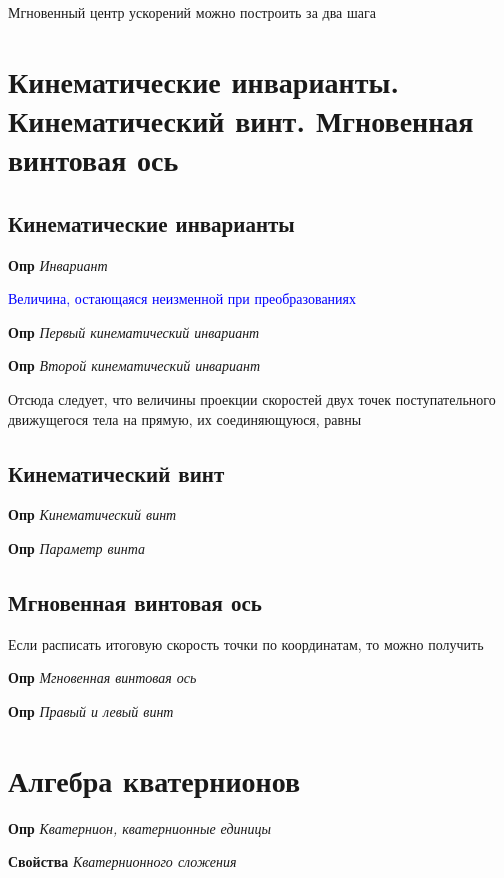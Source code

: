 \documentclass[a4paper, 14pt]{article}
\begin{document}
    Мгновенный центр ускорений можно построить за два шага
    
    \section{Кинематические инварианты.
    Кинематический винт.
    Мгновенная винтовая ось}
    
    \subsection{Кинематические инварианты}
    
    \textbf{Опр} \textit{Инвариант}
    
    \textcolor{blue}{Величина, остающаяся неизменной при преобразованиях}
    
    \textbf{Опр} \textit{Первый кинематический инвариант}
    
    \textbf{Опр} \textit{Второй кинематический инвариант}
    
    Отсюда следует, что величины проекции скоростей двух точек поступательного движущегося тела на прямую, их
    соединяющуюся, равны
    
    \subsection{Кинематический винт}
    
    \textbf{Опр} \textit{Кинематический винт}
    
    \textbf{Опр} \textit{Параметр винта}
    
    \subsection{Мгновенная винтовая ось}
    
    Если расписать итоговую скорость точки по координатам, то можно получить
    
    \textbf{Опр} \textit{Мгновенная винтовая ось}
    
    \textbf{Опр} \textit{Правый и левый винт}
    
    \section{Алгебра кватернионов}
    
    \textbf{Опр} \textit{Кватернион, кватернионные единицы}
    
    \textbf{Свойства} \textit{Кватернионного сложения}
    
\end{document}
